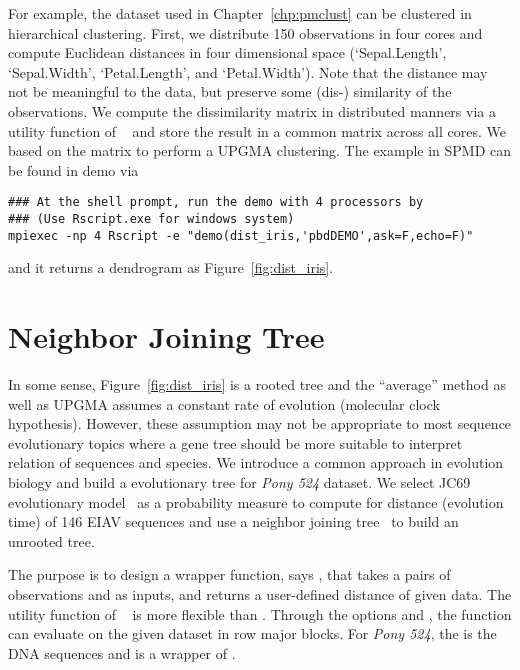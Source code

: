 For example, the  dataset used in Chapter~\ref{chp:pmclust} can be
clustered in hierarchical clustering. First, we distribute 150 observations
in four cores and compute Euclidean distances in four dimensional space
(`Sepal.Length', `Sepal.Width', `Petal.Length', and `Petal.Width').
Note that the distance may not be meaningful to the data, but preserve
some (dis-) similarity of the observations.
We compute the dissimilarity matrix in distributed manners via a
utility function 
of ~\citep{Chen2012pbdMPIpackage}
and store the result in a common matrix across all cores. We based on
the matrix to perform a UPGMA clustering. The example in SPMD can be
found in demo via
\begin{lstlisting}
### At the shell prompt, run the demo with 4 processors by
### (Use Rscript.exe for windows system)
mpiexec -np 4 Rscript -e "demo(dist_iris,'pbdDEMO',ask=F,echo=F)"
\end{lstlisting}
and it returns a dendrogram as Figure~\ref{fig:dist_iris}.



\section{Neighbor Joining Tree}

In some sense, Figure~\ref{fig:dist_iris} is a rooted tree and the
``average'' method as well as UPGMA assumes a constant rate of evolution
(molecular clock hypothesis). However, these assumption may not be
appropriate to most sequence evolutionary topics where a gene tree should
be more suitable to interpret relation of sequences and species.
We introduce a common approach in evolution biology and build a
evolutionary tree for {\it Pony 524} dataset.
We select JC69 evolutionary model~\citep{Jukes1969} as a probability measure
to compute for distance (evolution time) of 146 EIAV sequences and
use a neighbor joining tree~\citep{Saitou1987} to build an unrooted tree.

The purpose is to design a wrapper function, says ,
that takes a pairs of observations  and  as inputs, and
returns a user-defined distance of given data.
The utility function 
of ~\citep{Chen2012pbdMPIpackage}
is more flexible than .
Through the options  and , the
function can evaluate  on the given dataset  in
row major blocks.
For {\it Pony 524}, the  is the DNA sequences and 
is a wrapper of .

